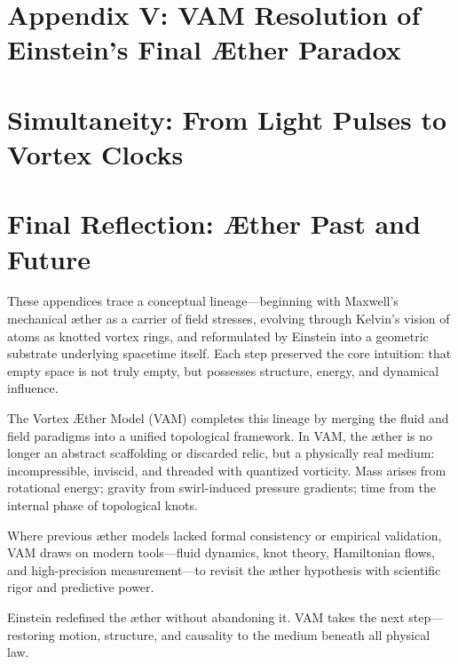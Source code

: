 \documentclass[preprint,notitlepage]{revtex4-2}
\begin{document}
\section*{Appendix V: VAM Resolution of Einstein’s Final Æther Paradox}
\label{appendix:final-aether}


\section{Simultaneity: From Light Pulses to Vortex Clocks}


\section*{Final Reflection: Æther Past and Future}

    These appendices trace a conceptual lineage—beginning with Maxwell's mechanical æther as a carrier of field stresses, evolving through Kelvin's vision of atoms as knotted vortex rings, and reformulated by Einstein into a geometric substrate underlying spacetime itself. Each step preserved the core intuition: that empty space is not truly empty, but possesses structure, energy, and dynamical influence.

    The Vortex Æther Model (VAM) completes this lineage by merging the fluid and field paradigms into a unified topological framework. In VAM, the æther is no longer an abstract scaffolding or discarded relic, but a physically real medium: incompressible, inviscid, and threaded with quantized vorticity. Mass arises from rotational energy; gravity from swirl-induced pressure gradients; time from the internal phase of topological knots.

    Where previous æther models lacked formal consistency or empirical validation, VAM draws on modern tools—fluid dynamics, knot theory, Hamiltonian flows, and high-precision measurement—to revisit the æther hypothesis with scientific rigor and predictive power.

    Einstein redefined the æther without abandoning it. VAM takes the next step—restoring motion, structure, and causality to the medium beneath all physical law.



    
    
\end{document}
